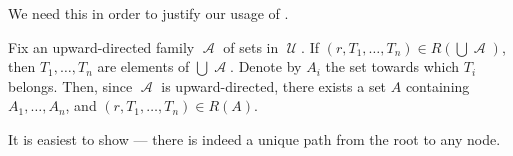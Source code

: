 \begin{defproof}
   We need this in order to justify our usage of .

  Fix an upward-directed family \( \mscrA \) of sets in \( \mscrU \). If \( (r, T_1, \ldots, T_n) \in R(\bigcup \mscrA) \), then \( T_1, \ldots, T_n \) are elements of \( \bigcup \mscrA \). Denote by \( A_i \) the set towards which \( T_i \) belongs. Then, since \( \mscrA \) is upward-directed, there exists a set \( A \) containing \( A_1, \ldots, A_n \), and \( (r, T_1, \ldots, T_n) \in R(A) \).

   It is easiest to show  --- there is indeed a unique path from the root to any node.
\end{defproof}

